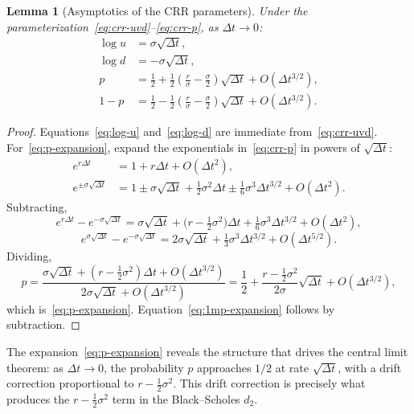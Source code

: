\documentclass[11pt,a4paper]{article}
\theoremstyle{plain}
\newtheorem{lemma}[theorem]{Lemma}
\theoremstyle{definition}
\begin{document}
\begin{lemma}[Asymptotics of the CRR parameters]
\label{lem:asymptotics}
Under the parameterization~\eqref{eq:crr-uvd}--\eqref{eq:crr-p}, as
$\Delta t \to 0$:
\begin{align}
    \log u &= \sigma \sqrt{\Delta t}, \label{eq:log-u} \\
    \log d &= -\sigma \sqrt{\Delta t}, \label{eq:log-d} \\
    p &= \frac{1}{2} + \frac{1}{2}\!\left(\frac{r}{\sigma} - \frac{\sigma}{2}\right)
            \sqrt{\Delta t} + O(\Delta t^{3/2}), \label{eq:p-expansion}\\
    1 - p &= \frac{1}{2} - \frac{1}{2}\!\left(\frac{r}{\sigma} - \frac{\sigma}{2}\right)
            \sqrt{\Delta t} + O(\Delta t^{3/2}). \label{eq:1mp-expansion}
\end{align}
\end{lemma}

\begin{proof}
Equations~\eqref{eq:log-u} and~\eqref{eq:log-d} are immediate
from~\eqref{eq:crr-uvd}. For~\eqref{eq:p-expansion}, expand the
exponentials in~\eqref{eq:crr-p} in powers of $\sqrt{\Delta t}$:
\begin{align*}
    e^{r\Delta t} &= 1 + r\Delta t + O(\Delta t^2), \\
    e^{\pm \sigma\sqrt{\Delta t}}
        &= 1 \pm \sigma\sqrt{\Delta t} + \tfrac{1}{2}\sigma^2 \Delta t
           \pm \tfrac{1}{6}\sigma^3 \Delta t^{3/2} + O(\Delta t^2).
\end{align*}
Subtracting,
\[
e^{r\Delta t} - e^{-\sigma\sqrt{\Delta t}}
= \sigma\sqrt{\Delta t} + \bigl(r - \tfrac{1}{2}\sigma^2\bigr)\Delta t
  + \tfrac{1}{6}\sigma^3 \Delta t^{3/2} + O(\Delta t^2),
\]
\[
e^{\sigma\sqrt{\Delta t}} - e^{-\sigma\sqrt{\Delta t}}
= 2\sigma\sqrt{\Delta t} + \tfrac{1}{3}\sigma^3 \Delta t^{3/2} + O(\Delta t^{5/2}).
\]
Dividing,
\[
p = \frac{\sigma\sqrt{\Delta t} + (r - \tfrac{1}{2}\sigma^2)\Delta t
       + O(\Delta t^{3/2})}
       {2\sigma\sqrt{\Delta t} + O(\Delta t^{3/2})}
  = \frac{1}{2} + \frac{r - \tfrac{1}{2}\sigma^2}{2\sigma}\sqrt{\Delta t}
    + O(\Delta t^{3/2}),
\]
which is~\eqref{eq:p-expansion}. Equation~\eqref{eq:1mp-expansion} follows
by subtraction.
\end{proof}

The expansion~\eqref{eq:p-expansion} reveals the structure that drives
the central limit theorem: as $\Delta t \to 0$, the probability $p$
approaches $1/2$ at rate $\sqrt{\Delta t}$, with a drift correction
proportional to $r - \tfrac{1}{2}\sigma^2$. This drift correction is
precisely what produces the $r - \tfrac{1}{2}\sigma^2$ term in the
Black--Scholes $d_2$.
\end{document}
